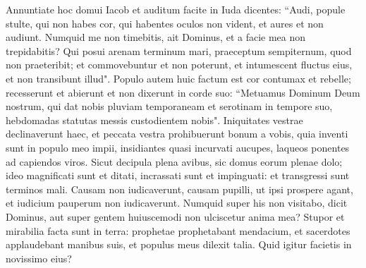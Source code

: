 \begin{biblechapter}
\verse Annuntiate hoc domui Iacob et auditum facite in Iuda dicentes: 
\verse “Audi, popule stulte, qui non habes cor, qui habentes oculos non vident, et aures et non audiunt. 
\verse Numquid me non timebitis, ait Dominus, et a facie mea non trepidabitis? Qui posui arenam terminum mari, praeceptum sempiternum, quod non praeteribit; et commovebuntur et non poterunt, et intumescent fluctus eius, et non transibunt illud". 
\verse Populo autem huic factum est cor contumax et rebelle; recesserunt et abierunt 
\verse et non dixerunt in corde suo: “Metuamus Dominum Deum nostrum, qui dat nobis pluviam temporaneam et serotinam in tempore suo, hebdomadas statutas messis custodientem nobis". 
\verse Iniquitates vestrae declinaverunt haec, et peccata vestra prohibuerunt bonum a vobis, 
\verse quia inventi sunt in populo meo impii, insidiantes quasi incurvati aucupes, laqueos ponentes ad capiendos viros. 
\verse Sicut decipula plena avibus, sic domus eorum plenae dolo; ideo magnificati sunt et ditati, 
\verse incrassati sunt et impinguati: et transgressi sunt terminos mali. Causam non iudicaverunt, causam pupilli, ut ipsi prospere agant, et iudicium pauperum non iudicaverunt. 
\verse Numquid super his non visitabo, dicit Dominus, aut super gentem huiuscemodi non ulciscetur anima mea? 
\verse Stupor et mirabilia facta sunt in terra: 
\verse prophetae prophetabant mendacium, et sacerdotes applaudebant manibus suis, et populus meus dilexit talia. Quid igitur facietis in novissimo eius? 
\end{biblechapter}

